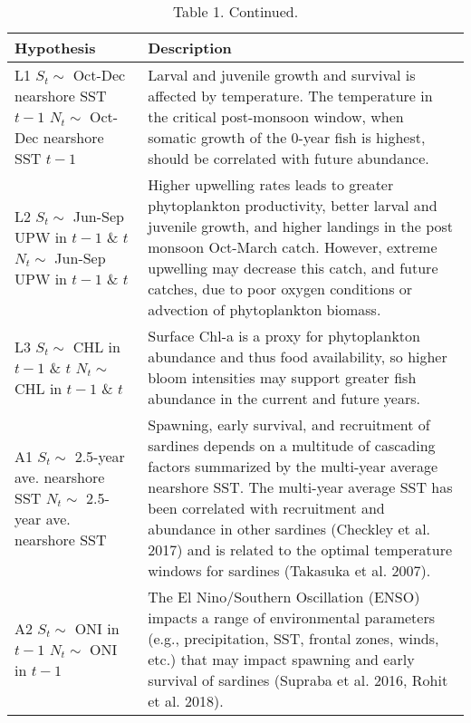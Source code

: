 \begin{table}

\caption{\label{tab:unnamed-chunk-2}Table 1. Continued.}
\centering
\begin{tabular}[t]{>{\raggedright\arraybackslash}p{5.5cm}|>{\raggedright\arraybackslash}p{10cm}}
\hline
Hypothesis & Description\\
\hline
L1 \newline $S_t \sim$ Oct-Dec nearshore SST $t-1$ \newline $N_t \sim$ Oct-Dec nearshore SST $t-1$ & Larval and juvenile growth and survival is affected by temperature. The temperature in the critical post-monsoon window, when somatic growth of the 0-year fish is highest, should be correlated with future abundance.\\
\hline
L2 \newline $S_t \sim$ Jun-Sep UPW in $t-1$ \& $t$ \newline $N_t \sim$ Jun-Sep UPW in $t-1$ \& $t$ & Higher upwelling rates leads to greater phytoplankton productivity, better larval and juvenile growth, and higher landings in the post monsoon Oct-March catch. However, extreme upwelling may decrease this catch, and future catches, due to poor oxygen conditions or advection of phytoplankton biomass.\\
\hline
L3 \newline $S_t\sim$ CHL in $t-1$ \& $t$ \newline $N_t \sim$ CHL in $t-1$ \& $t$ & Surface Chl-a is a proxy for phytoplankton abundance and thus food availability, so higher bloom intensities may support greater fish abundance in the current and future years.\\
\hline
A1 \newline $S_t \sim$ 2.5-year ave. nearshore SST \newline $N_t \sim$ 2.5-year ave. nearshore SST & Spawning, early survival, and recruitment of sardines depends on a multitude of cascading factors summarized by the multi-year average  nearshore SST. The multi-year average SST has been correlated with recruitment and abundance in other sardines (Checkley et al. 2017) and is related to the optimal temperature windows for sardines (Takasuka et al. 2007).\\
\hline
A2 \newline $S_t \sim$ ONI in $t-1$ \newline $N_t \sim$ ONI in $t-1$ & The El Nino/Southern Oscillation (ENSO) impacts a range of environmental parameters (e.g., precipitation, SST, frontal zones, winds, etc.) that may impact spawning and early survival of sardines (Supraba et al. 2016, Rohit et al. 2018).\\
\hline
\end{tabular}
\end{table}

